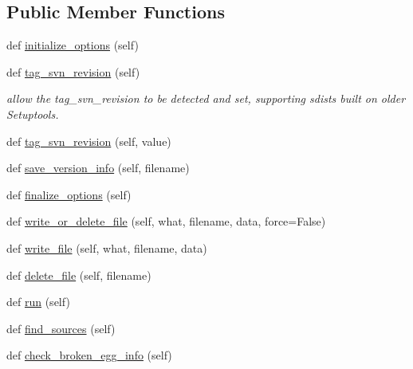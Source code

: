 \subsection*{Public Member Functions}
\begin{DoxyCompactItemize}
\item 
def \hyperlink{classsetuptools_1_1command_1_1egg__info_1_1egg__info_af10eb67dccf35e8622926eeeaa471232}{initialize\+\_\+options} (self)
\item 
def \hyperlink{classsetuptools_1_1command_1_1egg__info_1_1egg__info_a61a0f30d01ed01debb3448ea1e48208f}{tag\+\_\+svn\+\_\+revision} (self)
\begin{DoxyCompactList}\small\item\em allow the \textquotesingle{}tag\+\_\+svn\+\_\+revision\textquotesingle{} to be detected and set, supporting sdists built on older Setuptools. \end{DoxyCompactList}\item 
def \hyperlink{classsetuptools_1_1command_1_1egg__info_1_1egg__info_abac68b6e4edec08133adc83337b60b4e}{tag\+\_\+svn\+\_\+revision} (self, value)
\item 
def \hyperlink{classsetuptools_1_1command_1_1egg__info_1_1egg__info_aff24c2a57934f3ea7ff9a14d0cacf6bd}{save\+\_\+version\+\_\+info} (self, filename)
\item 
def \hyperlink{classsetuptools_1_1command_1_1egg__info_1_1egg__info_ab62dc812cd7873e55721c014fcf3207f}{finalize\+\_\+options} (self)
\item 
def \hyperlink{classsetuptools_1_1command_1_1egg__info_1_1egg__info_af70ce31ed5b38118ad41b3899f56f9b8}{write\+\_\+or\+\_\+delete\+\_\+file} (self, what, filename, data, force=False)
\item 
def \hyperlink{classsetuptools_1_1command_1_1egg__info_1_1egg__info_a7f78ac9292da94a3f8e82b9fa1027472}{write\+\_\+file} (self, what, filename, data)
\item 
def \hyperlink{classsetuptools_1_1command_1_1egg__info_1_1egg__info_a6fa3267879d13f06600d4d1e42c26068}{delete\+\_\+file} (self, filename)
\item 
def \hyperlink{classsetuptools_1_1command_1_1egg__info_1_1egg__info_a2106186df5059123bd731e2539472b0d}{run} (self)
\item 
def \hyperlink{classsetuptools_1_1command_1_1egg__info_1_1egg__info_a689901dc0b3f93b8ea62c954097b7627}{find\+\_\+sources} (self)
\item 
def \hyperlink{classsetuptools_1_1command_1_1egg__info_1_1egg__info_aa00b1968be994182d4dc99f2a4cfb7fc}{check\+\_\+broken\+\_\+egg\+\_\+info} (self)
\end{DoxyCompactItemize}
